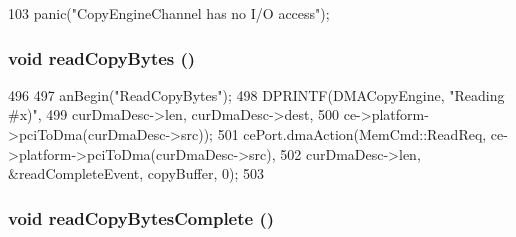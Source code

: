 \begin{DoxyCode}
103                         { panic("CopyEngineChannel has no I/O access\n");}
\end{DoxyCode}
\hypertarget{classCopyEngine_1_1CopyEngineChannel_a366c54487857e85b17043ef81def74ee}{
\subsubsection[{readCopyBytes}]{\setlength{\rightskip}{0pt plus 5cm}void readCopyBytes ()}}
\label{classCopyEngine_1_1CopyEngineChannel_a366c54487857e85b17043ef81def74ee}



\begin{DoxyCode}
496 {
497     anBegin("ReadCopyBytes");
498     DPRINTF(DMACopyEngine, "Reading %
      #x)\n",
499            curDmaDesc->len, curDmaDesc->dest,
500            ce->platform->pciToDma(curDmaDesc->src));
501     cePort.dmaAction(MemCmd::ReadReq, ce->platform->pciToDma(curDmaDesc->src),
502                      curDmaDesc->len, &readCompleteEvent, copyBuffer, 0);
503 }
\end{DoxyCode}
\hypertarget{classCopyEngine_1_1CopyEngineChannel_a9bb5ef45f6e13dccc565640d1ccb8cdd}{
\subsubsection[{readCopyBytesComplete}]{\setlength{\rightskip}{0pt plus 5cm}void readCopyBytesComplete ()}}
\label{classCopyEngine_1_1CopyEngineChannel_a9bb5ef45f6e13dccc565640d1ccb8cdd}



